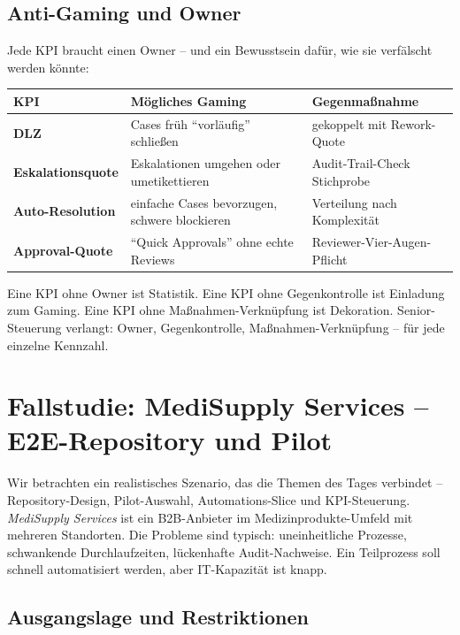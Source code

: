 \documentclass[11pt,a4paper,oneside]{article}
\begin{document}
\subsection{Anti-Gaming und Owner}

Jede KPI braucht einen Owner -- und ein Bewusstsein dafür, wie sie verfälscht werden könnte:

\begin{tabularx}{\linewidth}{@{}>{\bfseries}lXl@{}}
\toprule
KPI & Mögliches Gaming & Gegenmaßnahme \\
\midrule
DLZ & Cases früh ``vorläufig'' schließen & gekoppelt mit Rework-Quote \\
Eskalationsquote & Eskalationen umgehen oder umetikettieren & Audit-Trail-Check Stichprobe \\
Auto-Resolution & einfache Cases bevorzugen, schwere blockieren & Verteilung nach Komplexität \\
Approval-Quote & ``Quick Approvals'' ohne echte Reviews & Reviewer-Vier-Augen-Pflicht \\
\bottomrule
\end{tabularx}

\medskip

\begin{merkbox}
Eine KPI ohne Owner ist Statistik. Eine KPI ohne Gegenkontrolle ist Einladung zum Gaming. Eine KPI ohne Maßnahmen-Verknüpfung ist Dekoration. Senior-Steuerung verlangt: Owner, Gegenkontrolle, Maßnahmen-Verknüpfung -- für jede einzelne Kennzahl.
\end{merkbox}

\section{Fallstudie: MediSupply Services -- E2E-Repository und Pilot}

Wir betrachten ein realistisches Szenario, das die Themen des Tages verbindet -- Repository-Design, Pilot-Auswahl, Automations-Slice und KPI-Steuerung. \emph{MediSupply Services} ist ein B2B-Anbieter im Medizinprodukte-Umfeld mit mehreren Standorten. Die Probleme sind typisch: uneinheitliche Prozesse, schwankende Durchlaufzeiten, lückenhafte Audit-Nachweise. Ein Teilprozess soll schnell automatisiert werden, aber IT-Kapazität ist knapp.

\subsection{Ausgangslage und Restriktionen}
\end{document}
